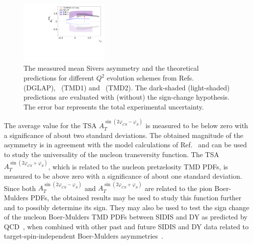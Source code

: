 \documentclass[a4paper,manyauthors,nocleardouble,COMPASS]{cernphprep}
\newcommand{\phiCS}{\varphi _{CS}}
\newcommand{\phiS}{\varphi _S}
\begin{document}
%
%
%
%
%
%
\begin{figure}[tbp]
\centering
\includegraphics[width=0.39\textwidth]{plots/Sivers_xF.pdf}
\caption{The measured mean Sivers asymmetry and the
theoretical  predictions for different $Q^2$ evolution schemes from Refs.~\cite{Anselmino:2016uie} (DGLAP),~\cite{Echevarria:2014xaa} (TMD1)
and~\cite{Sun:2013hua} (TMD2).
The dark-shaded (light-shaded) predictions are evaluated with (without) the sign-change hypothesis. The error bar represents the total experimental uncertainty.}
\label{fig:Siv_theor}
\end{figure}
%


The average value for the TSA  $A_T^{\sin(2\phiCS-\phiS)}$ is measured to be below zero with a significance of about two standard deviations. The obtained magnitude of the asymmetry is in agreement with the model calculations of Ref.~\cite{Sissakian:2010zza} and can be used to study the universality of the nucleon transversity function. The TSA $A_T^{\sin(2\phiCS+\phiS)}$, which is related to the nucleon pretzelosity TMD PDFs, is measured to be above zero with a significance of about one standard deviation. Since both $A_T^{\sin(2\phiCS-\phiS)}$ and $A_T^{\sin(2\phiCS+\phiS)}$ are related to the pion Boer-Mulders PDFs, the obtained results may be used to study this function further and to possibly determine its sign.
%
They may also be used to test the sign change of the nucleon Boer-Mulders TMD PDFs between SIDIS and DY as predicted by QCD~\cite{Collins:2002kn, Brodsky:2002cx, Brodsky:2002rv}, when combined with other past and future SIDIS and DY data related to target-spin-independent Boer-Mulders asymmetries~\cite{Falciano:1986wk,Airapetian:2012yg,Adolph:2014pwc}.
%
\end{document}
